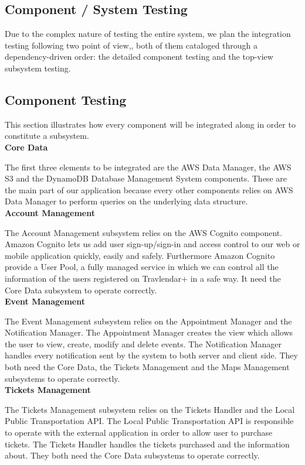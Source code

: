 \subsection*{Component / System Testing}
Due to the complex nature of testing the entire system, we plan the integration testing following two point of view,, both of them cataloged through a dependency-driven order: the detailed component testing and the top-view subsystem testing.

\subsection*{Component Testing}
This section illustrates how every component will be integrated along in order to constitute a subsystem. \\

\textbf{Core Data}

The first three elements to be integrated are the AWS Data Manager, the AWS S3 and the DynamoDB Database Management System components.
These are the main part of our application because every other components relies on AWS Data Manager to perform queries on the underlying data structure.\\

\textbf{Account Management}

The Account Management subsystem relies on the AWS Cognito component. 
Amazon Cognito lets us add user sign-up/sign-in and access control to our web or mobile application quickly, easily and safely. Furthermore Amazon Cognito provide a User Pool, a fully managed service in which we can control all the information of the users registered on Travlendar+ in a safe way.
It need the Core Data subsystem to operate correctly.\\

\textbf{Event Management}

The Event Management subsystem relies on the Appointment Manager and the Notification Manager. 
The Appointment Manager creates the view which allows the user to view, create, modify and delete events. The Notification Manager handles every notification sent by the system to both server and client side.
They both need the Core Data, the Tickets Management and the Maps Management subsystems to operate correctly.\\

\textbf{Tickets Management}

The Tickets Management subsystem relies on the Tickets Handler and the Local Public Transportation API. The Local Public Transportation API is responsible to operate with the external application in order to allow user to purchase tickets. The Tickets Handler handles the tickets purchased and the information about.
They both need the Core Data subsystems to operate correctly.\\

